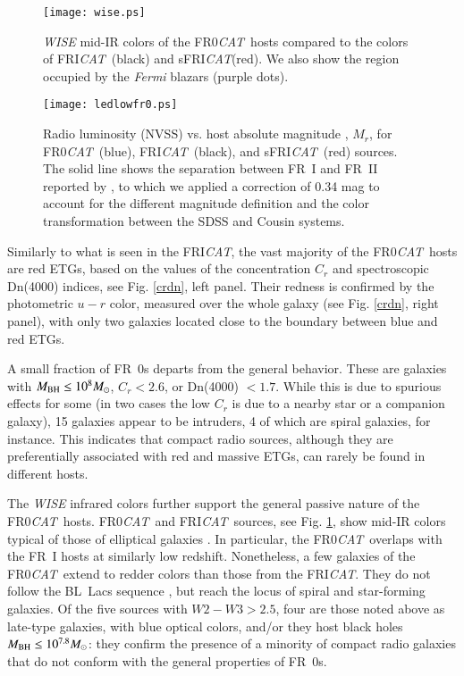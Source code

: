 \documentclass[traditabstract]{aa}
\newcommand{\FR}{FRI{\sl{CAT}}}\newcommand{\FRII}{FRII{\sl{CAT}}}
\newcommand{\FRo}{FR0{\sl{CAT}}}
\newcommand{\sFR}{sFRI{\sl{CAT}}}
\begin{document}
\begin{figure}
\texttt{[image: wise.ps]}
\caption{{\em{WISE}} mid-IR colors of the \FRo\ hosts compared to the colors of
  \FR\ (black) and \sFR (red). We also show the region occupied by the
       {\em{Fermi}} blazars (purple dots).}
\label{wise}
\end{figure}

\begin{figure}
\texttt{[image: ledlowfr0.ps]}
\caption{Radio luminosity (NVSS) vs. host absolute magnitude , $M_r$, for
  \FRo\ (blue), \FR\ (black), and \sFR\ (red) sources. The solid line shows
  the separation between FR~I and FR~II reported by \citet{ledlow96}, to which
  we applied a correction of 0.34 mag to account for the different magnitude
  definition and the color transformation between the SDSS and Cousin
  systems.}
\label{ledlow}
\end{figure}

Similarly to what is seen in the \FR, the vast majority of the \FRo\
hosts are red ETGs, based on the values of the concentration $C_r$
\citep{strateva01} and spectroscopic Dn(4000) \citep{balogh99}
indices, see Fig. \ref{crdn}, left panel. Their redness is confirmed
by the photometric $u-r$ color, measured over the whole galaxy (see
Fig. \ref{crdn}, right panel), with only two galaxies located close to
the boundary between blue and red ETGs.

A small fraction of FR~0s departs from the general behavior.  These
are galaxies with $M_{\rm BH} \leq 10^8 M_\odot$, $C_r < 2.6$, or
Dn(4000) $< 1.7$. While this is due to spurious effects for some (in
two cases the low $C_r$ is due to a nearby star or a companion
galaxy), 15 galaxies appear to be intruders, 4 of which are spiral
galaxies, for instance. This indicates that compact radio sources,
although they are preferentially associated with red and massive ETGs,
can rarely be found in different hosts.

The {\em{WISE}} infrared colors further support the general passive
nature of the \FRo\ hosts. \FRo\ and \FR\ sources, see
Fig. \ref{wise}, show mid-IR colors typical of those of elliptical
galaxies \citep{wright10}. In particular, the \FRo\ overlaps with the
FR~I hosts at similarly low redshift. Nonetheless, a few galaxies of
the \FRo\ extend to redder colors than those from the \FR. They do not
follow the BL~Lacs sequence \citep{massaro12}, but reach the locus of
spiral and star-forming galaxies. Of the five sources with
$W2-W3> 2.5$, four are those noted above as late-type galaxies, with
blue optical colors, and/or they host black holes
$M_{\rm BH} \leq 10^{7.8} M_\odot$: they confirm the presence of a
minority of compact radio galaxies that do not conform with the
general properties of FR~0s.
\end{document}
